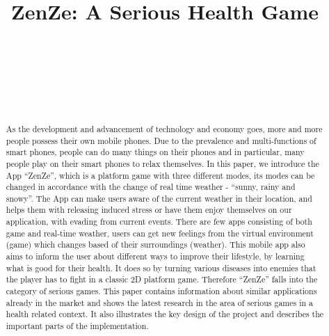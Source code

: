 \documentclass{sigchi}
\def\plaintitle{ZenZe: A Serious Health Game}
\begin{document}
\title{\plaintitle}

\author{
  	\\
	\\
    \\
    \\
    \\
}

\maketitle
\begin{abstract}
As the development and advancement of technology and economy goes, more and more people possess their own mobile phones. Due to the prevalence and multi-functions of smart phones, people can do many things on their phones and in particular, many people play on their smart phones to relax themselves. In this paper, we introduce the App ``ZenZe'', which is a platform game with three different modes, its modes can be changed in accordance with the change of real time weather - ``sunny, rainy and snowy''. The App can make users aware of the current weather in their location, and helps them with releasing induced stress or have them enjoy themselves on our application, with evading from current events. There are few apps consisting of both game and real-time weather, users can get new feelings from the virtual environment (game) which changes based of their surroundings (weather). This mobile app also aims to inform the user about different ways to improve their lifestyle, by learning what is good for their health. It does so by turning various diseases into enemies that the player has to fight in a classic 2D platform game. Therefore ``ZenZe'' falls into the category of serious games. This paper contains information about similar applications already in the market and shows the latest research in the area of serious games in a health related context. It also illustrates the key design of the project and describes the important parts of the implementation.
\end{abstract}
\end{document}
